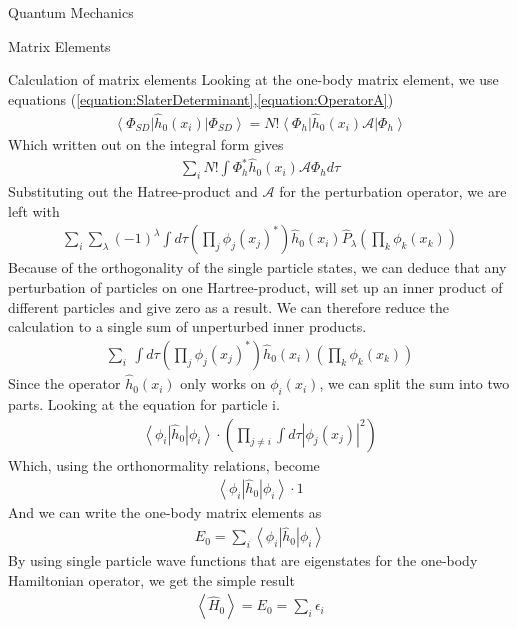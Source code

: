 \documentclass[twoside,english]{uiofysmaster}
\begin{document}
\begin{chapter}{Quantum Mechanics}
\begin{section}{Matrix Elements}
		\begin{subsection}{Calculation of matrix elements}
			Looking at the one-body matrix element, we use equations (\ref{equation:SlaterDeterminant},\ref{equation:OperatorA})
			\begin{align}
				\left< \Phi_{SD} \right| \hat h_0(x_i) \left| \Phi_{SD} \right> = N! \left< \Phi_h \right| \hat h_0(x_i) \mathcal{A} \left| \Phi_h \right> 
			\end{align}
			Which written out on the integral form gives
			\begin{align}
				\sum_i N! \int \Phi_h^* \hat h_0(x_i) \mathcal{A} \Phi_h d\tau 
			\end{align}
			Substituting out the Hatree-product and $\mathcal{A}$ for the perturbation operator, we are left with
			\begin{align}
				\sum_i \sum_\lambda (-1)^\lambda \int d\tau \left( \prod_j \phi_j(x_j)^* \right) \hat h_0(x_i) \hat P_\lambda \left( \prod_k \phi_k(x_k) \right)
			\end{align}
			Because of the orthogonality of the single particle states, we can deduce that any perturbation of particles on one Hartree-product, will set up an inner product of different particles and give zero as a result. We can therefore reduce the calculation to a single sum of unperturbed inner products. 
			\begin{align}
				\sum_i \ \int d\tau \left( \prod_j \phi_j(x_j)^* \right) \hat h_0(x_i) \left( \prod_k \phi_k(x_k) \right) 
			\end{align}
			Since the operator $\hat h_0(x_i)$ only works on $\phi_i(x_i)$, we can split the sum into two parts. Looking at the equation for particle i.
			\begin{align}
				\left< \phi_i \right| \hat h_0 \left| \phi_i \right> \cdot  \left( \prod_{j \neq i} \int d\tau \left| \phi_j(x_j) \right|^2 \right)
			\end{align}
			Which, using the orthonormality relations, become
			\begin{align}
				\left< \phi_i \right| \hat h_0 \left| \phi_i \right> \cdot 1
			\end{align}
			And we can write the one-body matrix elements as
			\begin{align}
				E_0 = \sum_i \left< \phi_i \right| \hat h_0 \left| \phi_i \right>
			\end{align}
			By using single particle wave functions that are eigenstates for the one-body Hamiltonian operator, we get the simple result
			\begin{align}
				\left< \right. \hat H_0 \left. \right> = E_0 = \sum_i \epsilon_i 
			\end{align}


\end{subsection}
\end{section}
\end{chapter}
\end{document}
